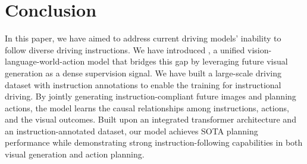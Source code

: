 \section{Conclusion}
\label{sec: conclusion}
In this paper, we have aimed to address current driving models' inability to follow diverse driving instructions. 
We have introduced \model, a unified vision-language-world-action model that bridges this gap by leveraging future visual generation as a dense supervision signal. 
We have built a large-scale driving dataset with instruction annotations to enable the training for instructional driving. 
By jointly generating instruction-compliant future images and planning actions, the model learns the causal relationships among instructions, actions, and the visual outcomes. 
Built upon an integrated transformer architecture and an instruction-annotated dataset, our model achieves SOTA planning performance while demonstrating strong instruction-following capabilities in both visual generation and action planning.
